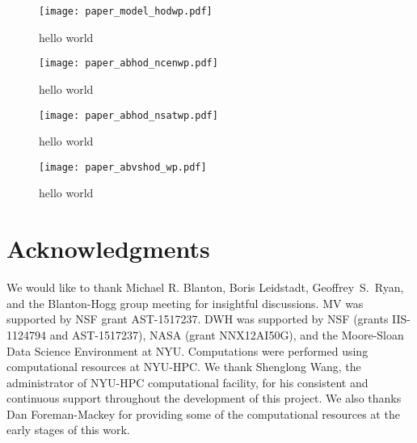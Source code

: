\documentclass[12pt, preprint]{emulateapj}
\begin{document}
\begin{figure*}
\begin{center}
\texttt{[image: paper\_model\_hodwp.pdf]}
\caption{hello world}
\label{fig:abc_converge}
\end{center}
\end{figure*}
\begin{figure*}
\begin{center}
\texttt{[image: paper\_abhod\_ncenwp.pdf]}
\caption{hello world}
\label{fig:abc_converge}
\end{center}
\end{figure*}
\begin{figure*}
\begin{center}
\texttt{[image: paper\_abhod\_nsatwp.pdf]}
\caption{hello world}
\label{fig:abc_converge}
\end{center}
\end{figure*}
\begin{figure*}
\begin{center}
\texttt{[image: paper\_abvshod\_wp.pdf]}
\caption{hello world}
\label{fig:abc_converge}
\end{center}
\end{figure*}
\section*{Acknowledgments}
We would like to thank Michael R. Blanton,  
Boris Leidstadt, Geoffrey~S.~Ryan, and the Blanton-Hogg group meeting for insightful discussions. MV was supported by NSF grant AST-1517237. DWH was supported 
by NSF (grants IIS-1124794 and AST-1517237), NASA (grant NNX12AI50G), and the Moore-Sloan 
Data Science Environment at NYU. Computations 
were performed using computational resources at NYU-HPC. We thank Shenglong Wang, the 
administrator of NYU-HPC computational facility, for his consistent and continuous support 
throughout the development of this project. We also thanks Dan Foreman-Mackey for providing some of the computational resources at the early stages of this work.
\end{document}
